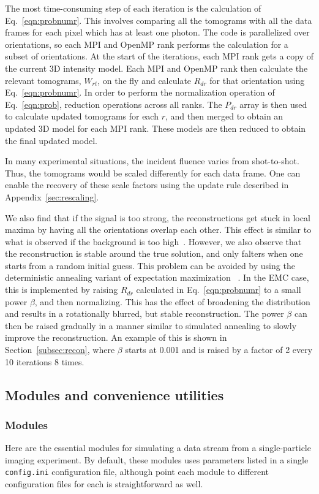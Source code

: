 \documentclass[]{iucr}              %
\begin{document}
The most time-consuming step of each iteration is the calculation of Eq.~\ref{eqn:probnumr}. This involves comparing all the tomograms with all the data frames for each pixel which has at least one photon. The code is parallelized over orientations, so each MPI and OpenMP rank performs the calculation for a subset of orientations. At the start of the iterations, each MPI rank gets a copy of the current 3D intensity model. Each MPI and OpenMP rank then calculate the relevant tomograms, $W_{rt}$, on the fly and calculate $R_{dr}$ for that orientation using Eq.~\ref{eqn:probnumr}. In order to perform the normalization operation of Eq.~\ref{eqn:prob}, reduction operations across all ranks. The $P_{dr}$ array is then used to calculate updated tomograms for each $r$, and then merged to obtain an updated 3D model for each MPI rank. These models are then reduced to obtain the final updated model.

In many experimental situations, the incident fluence varies from shot-to-shot. Thus, the tomograms would be scaled differently for each data frame. One can enable the recovery of these scale factors using the update rule described in Appendix~\ref{sec:rescaling}. 

We also find that if the signal is too strong, the reconstructions get stuck in local maxima by having all the orientations overlap each other. This effect is similar to what is observed if the background is too high~\cite{ayyer2015}. However, we also observe that the reconstruction is stable around the true solution, and only falters when one starts from a random initial guess. This problem can be avoided by using the deterministic annealing variant of expectation maximization ~\cite{ueda1998}. In the EMC case, this is implemented by raising $R_{dr}$ calculated in Eq.~\ref{eqn:probnumr} to a small power $\beta$, and then normalizing. This has the effect of broadening the distribution and results in a rotationally blurred, but stable reconstruction. The power $\beta$ can then be raised gradually in a manner similar to simulated annealing to slowly improve the reconstruction. An example of this is shown in Section~\ref{subsec:recon}, where $\beta$ starts at 0.001 and is raised by a factor of 2 every 10 iterations 8 times.

\subsection{Modules and convenience utilities}\label{subsec:mod+utils}
\subsubsection{Modules}\label{subsubsec:mods}
Here are the essential modules for simulating a data stream from a single-particle imaging experiment. By default, these modules uses parameters listed in a single \texttt{config.ini} configuration file, although point each module to different configuration files for each is straightforward as well.
\end{document}

